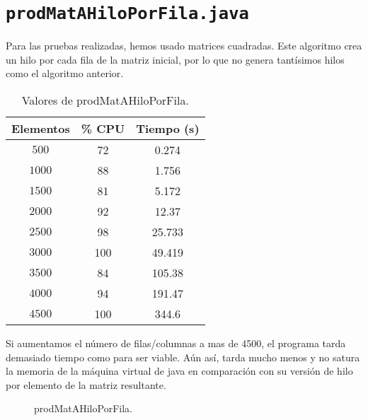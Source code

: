 \documentclass[12pt,letterpaper]{article}
\begin{document}
\section{\texttt{prodMatAHiloPorFila.java}}
\noindent
Para las pruebas realizadas, hemos usado matrices cuadradas. Este algoritmo crea un hilo por cada fila de la matriz inicial, por lo que no genera tantísimos hilos como el algoritmo anterior.
\begin{center}
	\begin{table}[htbp]
		\begin{center}
			\begin{tabular}{|c|c|c|}
				\hline
				\textbf{Elementos} & \textbf{\% CPU} & \textbf{Tiempo (s)}  \\
				\hline 
				$500$ & 72 & 0.274\\ \hline	
				$1000$ & 88 & 1.756\\ \hline
				$1500$ & 81 & 5.172\\ \hline
				$2000$ & 92 & 12.37\\ \hline
				$2500$ & 98 & 25.733\\ \hline
				$3000$ & 100 & 49.419\\ \hline
				$3500$ & 84 & 105.38\\ \hline
				$4000$ & 94 & 191.47\\ \hline
				$4500$ & 100 & 344.6\\ \hline	
			\end{tabular}
			\caption{Valores de prodMatAHiloPorFila.}
			\label{tabla:Valores de prodMatAHiloPorFila}
		\end{center}
	\end{table}
\end{center}
\noindent
Si aumentamos el número de filas/columnas a mas de 4500, el programa tarda demasiado tiempo como para ser viable. Aún así, tarda mucho menos y no satura la memoria de la máquina virtual de java en comparación con su versión de hilo por elemento de la matriz resultante.
\begin{figure}
	\begin{center}
		\caption{prodMatAHiloPorFila.}
		\label{fig: prodMatAHiloPorFila}
	\end{center}	
\end{figure}


\newpage
\end{document}
